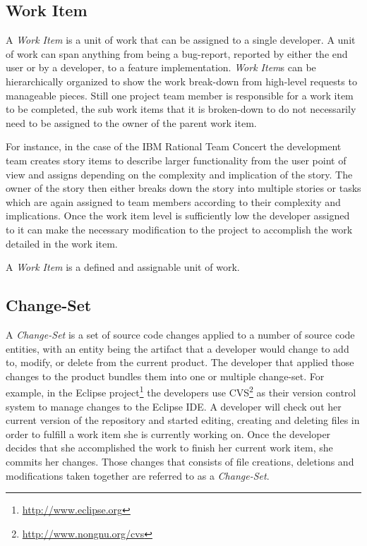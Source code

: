 \subsection{Work Item}
A \emph{Work Item} is a unit of work that can be assigned to a single developer.
A unit of work can span anything from being a bug-report, reported by either the end user or by a developer, to a feature implementation.
\emph{Work Item}s can be hierarchically organized to show the work break-down from high-level requests to manageable pieces.
Still one project team member is responsible for a work item to be completed, the sub work items that it is broken-down to do not necessarily need to be assigned to the owner of the parent work item.

For instance, in the case of the IBM Rational Team Concert the development team creates story items to describe larger functionality from the user point of view and assigns depending on the complexity and implication of the story.
The owner of the story then either breaks down the story into multiple stories or tasks which are again assigned to team members according to their complexity and implications.
Once the work item level is sufficiently low the developer assigned to it can make the necessary modification to the project to accomplish the work detailed in the work item.

\begin{note}
\begin{mydef}
A \emph{Work Item} is a defined and assignable unit of work.
\end{mydef}
\end{note} 

\subsection{Change-Set}
A \emph{Change-Set} is a set of source code changes applied to a number of source code entities, with an entity being the artifact that a developer would change to add to, modify, or delete from the current product. 
The developer that applied those changes to the product bundles them into one or multiple change-set.
For example, in the Eclipse project\footnote{\url{http://www.eclipse.org}} the developers use CVS\footnote{\url{http://www.nongnu.org/cvs}} as their version control system to manage changes to the Eclipse IDE.
A developer will check out her current version of the repository and started editing, creating and deleting files in order to fulfill a work item she is currently working on.
Once the developer decides that she accomplished the work to finish her current work item, she commits her changes.
Those changes that consists of file creations, deletions and modifications taken together are referred to as a \emph{Change-Set}. 

